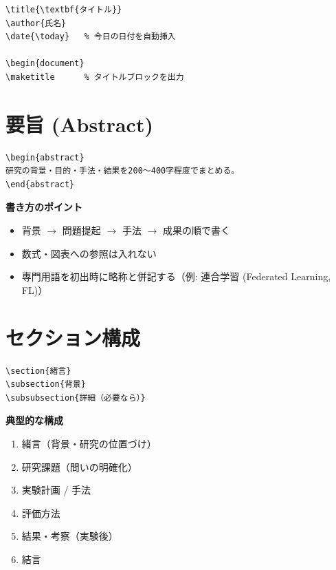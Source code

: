 \documentclass[dvipdfmx, twocolumn, 10pt]{bxjsarticle}
\begin{document}
\begin{lstlisting}
\title{\textbf{タイトル}}
\author{氏名}
\date{\today}   % 今日の日付を自動挿入

\begin{document}
\maketitle      % タイトルブロックを出力
\end{lstlisting}

\section{要旨 (Abstract)}

\begin{lstlisting}
\begin{abstract}
研究の背景・目的・手法・結果を200〜400字程度でまとめる。
\end{abstract}
\end{lstlisting}

\textbf{書き方のポイント}
\begin{itemize}
  \item 背景 $\to$ 問題提起 $\to$ 手法 $\to$ 成果の順で書く
  \item 数式・図表への参照は入れない
  \item 専門用語を初出時に略称と併記する（例: 連合学習 (Federated Learning, FL)）
\end{itemize}

\section{セクション構成}

\begin{lstlisting}
\section{緒言}
\subsection{背景}
\subsubsection{詳細（必要なら）}
\end{lstlisting}

\textbf{典型的な構成}
\begin{enumerate}
  \item 緒言（背景・研究の位置づけ）
  \item 研究課題（問いの明確化）
  \item 実験計画 / 手法
  \item 評価方法
  \item 結果・考察（実験後）
  \item 結言
\end{enumerate}
\end{document}
